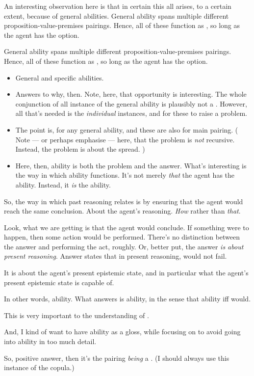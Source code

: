 \begin{note}
  An interesting observation here is that in certain this all arises, to a certain extent, because of general abilities.
  General ability spans multiple different proposition-value-premises pairings.
  Hence, all of these function as , so long as the agent has the option.

  General ability spans multiple different proposition-value-premises pairings.
  Hence, all of these function as , so long as the agent has the option.

  \begin{itemize}
  \item
    General and specific abilities.
  \item
    Answers to why, then.
    Note, here, that opportunity is interesting.
    The whole conjunction of all instance of the general ability is plausibly not a \requ{}.
    However, all that's needed is the \emph{individual} instances, and for these to raise a problem.
  \item
    The point is,  for any general ability, and these are also  for main pairing.
    (%
    Note --- or perhaps emphasise --- here, that the problem is \emph{not} recursive.
    Instead, the problem is about the spread.%
    )
  \item
    Here, then, ability is both the problem and the answer.
    What's interesting is the way in which ability functions.
    It's not merely \emph{that} the agent has the ability.
    Instead, it \emph{is} the ability.
  \end{itemize}
\end{note}

\begin{note}
  So, the way in which past reasoning relates is by ensuring that the agent would reach the same conclusion.
  About the agent's reasoning.
  \emph{How} rather than \emph{that}.

  Look, what we are getting is that the agent would conclude.
  If something were to happen, then some action would be performed.
  There's no distinction between the answer and performing the act, roughly.
  Or, better put, the answer \emph{is about present reasoning}.
  Answer states that in present reasoning, would not fail.

  It is about the agent's present epistemic state, and in particular what the agent's present epistemic state is capable of.

  In other words, ability.
  What answers is ability, in the sense that ability iff would.

  This is very important to the understanding of \fc{}.

  And, I kind of want to have ability as a gloss, while focusing on \fc{} to avoid going into ability in too much detail.

  So, positive answer, then it's the pairing \emph{being} a \fc{}.
  (I should always use this instance of the copula.)
\end{note}

